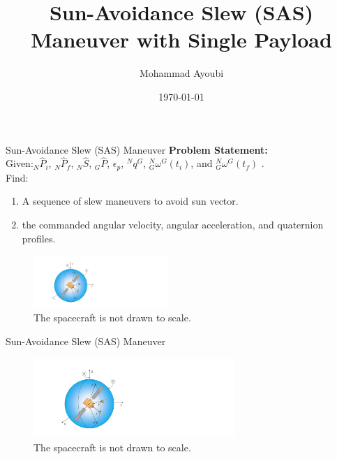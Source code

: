 \documentclass{beamer}
\title[Sun-Avoidance Slew (SAS) Maneuver ]{Sun-Avoidance Slew (SAS) Maneuver with Single Payload } %
\author{Mohammad Ayoubi} %
\date{\today} %
\begin{document}
\begin{frame}
  \titlepage
\end{frame}


\begin{frame}
\begin{block}{Sun-Avoidance Slew (SAS) Maneuver}
{\bf Problem Statement:}\\
Given:$_N\hat{P}_i$, $_N\hat{P}_f$, $_N\hat{S}$, $_G\hat{P}$, $\epsilon_p$, $^Nq^G$, $^N_G\omega^G(t_i)$, and $^N_G\omega^G(t_f)$ .\\
Find: 
\begin{enumerate}
\item A sequence of slew maneuvers to avoid sun vector.
\item the commanded angular velocity, angular acceleration, and quaternion profiles.
\end{enumerate} 
\end{block}
\begin{figure}
\includegraphics[width=2in]{./Figures/SAS_Schematic}
\caption{The spacecraft is not drawn to scale.}
\end{figure}
\end{frame}
\begin{frame}
\begin{block}{Sun-Avoidance Slew (SAS) Maneuver}
\begin{figure}
\includegraphics[width=3in]{./Figures/SAS_Schematic}
\caption{The spacecraft is not drawn to scale.}
\end{figure}
\end{block}
\end{frame}
\end{document}
